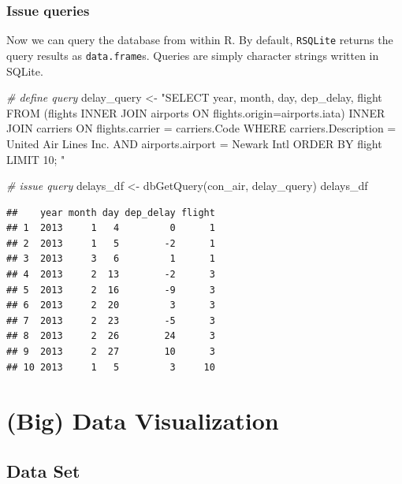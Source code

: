 \documentclass[
  12pt,
]{style/krantz}
\newenvironment{Shaded}{\begin{snugshade}}{\end{snugshade}}
\newcommand{\CommentTok}[1]{\textcolor[rgb]{0.56,0.35,0.01}{\textit{#1}}}
\newcommand{\FunctionTok}[1]{\textcolor[rgb]{0.00,0.00,0.00}{#1}}
\newcommand{\NormalTok}[1]{#1}
\newcommand{\OtherTok}[1]{\textcolor[rgb]{0.56,0.35,0.01}{#1}}
\newcommand{\StringTok}[1]{\textcolor[rgb]{0.31,0.60,0.02}{#1}}
\begin{document}
\hypertarget{issue-queries}{%
\subsection{Issue queries}\label{issue-queries}}

Now we can query the database from within R. By default, \texttt{RSQLite} returns the query results as \texttt{data.frame}s. Queries are simply character strings written in SQLite.

\begin{Shaded}
\begin{Highlighting}[]
\CommentTok{\# define query}
\NormalTok{delay\_query }\OtherTok{\textless{}{-}}
\StringTok{"SELECT }
\StringTok{year,}
\StringTok{month, }
\StringTok{day,}
\StringTok{dep\_delay,}
\StringTok{flight}
\StringTok{FROM (flights INNER JOIN airports ON flights.origin=airports.iata) }
\StringTok{INNER JOIN carriers ON flights.carrier = carriers.Code}
\StringTok{WHERE carriers.Description = \textquotesingle{}United Air Lines Inc.\textquotesingle{}}
\StringTok{AND airports.airport = \textquotesingle{}Newark Intl\textquotesingle{}}
\StringTok{ORDER BY flight}
\StringTok{LIMIT 10;}
\StringTok{"}

\CommentTok{\# issue query}
\NormalTok{delays\_df }\OtherTok{\textless{}{-}} \FunctionTok{dbGetQuery}\NormalTok{(con\_air, delay\_query)}
\NormalTok{delays\_df}
\end{Highlighting}
\end{Shaded}

\begin{verbatim}
##    year month day dep_delay flight
## 1  2013     1   4         0      1
## 2  2013     1   5        -2      1
## 3  2013     3   6         1      1
## 4  2013     2  13        -2      3
## 5  2013     2  16        -9      3
## 6  2013     2  20         3      3
## 7  2013     2  23        -5      3
## 8  2013     2  26        24      3
## 9  2013     2  27        10      3
## 10 2013     1   5         3     10
\end{verbatim}

\hypertarget{big-data-visualization}{%
\chapter{(Big) Data Visualization}\label{big-data-visualization}}

\hypertarget{data-set}{%
\section{Data Set}\label{data-set}}
\end{document}
